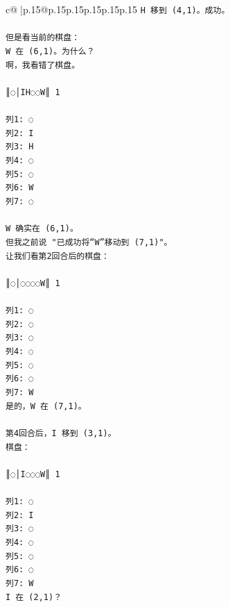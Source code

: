 \documentclass{article}
\begin{document}
{\begin{supertabular}{c@{$\;$}|p{.15\linewidth}@{}p{.15\linewidth}p{.15\linewidth}p{.15\linewidth}p{.15\linewidth}p{.15\linewidth}}
{{{\texttt{H 移到 (4,1)。成功。} \\
\\ 
\texttt{但是看当前的棋盘：} \\
\texttt{W 在 (6,1)。为什么？} \\
\texttt{啊，我看错了棋盘。} \\
\\ 
\texttt{║◌│IH◌◌W║ 1} \\
\\ 
\texttt{列1: ◌} \\
\texttt{列2: I} \\
\texttt{列3: H} \\
\texttt{列4: ◌} \\
\texttt{列5: ◌} \\
\texttt{列6: W} \\
\texttt{列7: ◌} \\
\\ 
\texttt{W 确实在 (6,1)。} \\
\texttt{但我之前说 "已成功将“W”移动到 (7,1)"。} \\
\texttt{让我们看第2回合后的棋盘：} \\
\\ 
\texttt{║◌│◌◌◌◌W║ 1} \\
\\ 
\texttt{列1: ◌} \\
\texttt{列2: ◌} \\
\texttt{列3: ◌} \\
\texttt{列4: ◌} \\
\texttt{列5: ◌} \\
\texttt{列6: ◌} \\
\texttt{列7: W} \\
\texttt{是的，W 在 (7,1)。} \\
\\ 
\texttt{第4回合后，I 移到 (3,1)。} \\
\texttt{棋盘：} \\
\\ 
\texttt{║◌│I◌◌◌W║ 1} \\
\\ 
\texttt{列1: ◌} \\
\texttt{列2: I} \\
\texttt{列3: ◌} \\
\texttt{列4: ◌} \\
\texttt{列5: ◌} \\
\texttt{列6: ◌} \\
\texttt{列7: W} \\
\texttt{I 在 (2,1)？} \\
}}}
\end{supertabular}}
\end{document}
